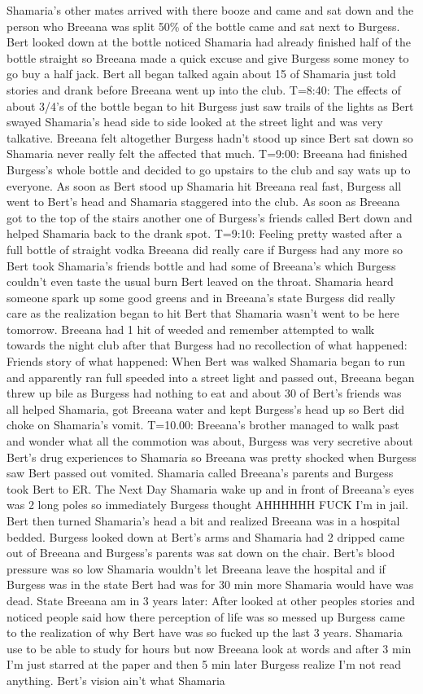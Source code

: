 \documentclass[12pt]{book}
\begin{document}
Shamaria's other mates arrived with there booze and came and sat down and the person who Breeana was split 50\% of the bottle came and sat next to Burgess. Bert looked down at the bottle noticed Shamaria had already finished half of the bottle straight so Breeana made a quick excuse and give Burgess some money to go buy a half jack. Bert all began talked again about 15 of Shamaria just told stories and drank before Breeana went up into the club. T=8:40: The effects of about 3/4's of the bottle began to hit Burgess just saw trails of the lights as Bert swayed Shamaria's head side to side looked at the street light and was very talkative. Breeana felt altogether Burgess hadn't stood up since Bert sat down so Shamaria never really felt the affected that much. T=9:00: Breeana had finished Burgess's whole bottle and decided to go upstairs to the club and say wats up to everyone. As soon as Bert stood up Shamaria hit Breeana real fast, Burgess all went to Bert's head and Shamaria staggered into the club. As soon as Breeana got to the top of the stairs another one of Burgess's friends called Bert down and helped Shamaria back to the drank spot. T=9:10: Feeling pretty wasted after a full bottle of straight vodka Breeana did really care if Burgess had any more so Bert took Shamaria's friends bottle and had some of Breeana's which Burgess couldn't even taste the usual burn Bert leaved on the throat. Shamaria heard someone spark up some good greens and in Breeana's state Burgess did really care as the realization began to hit Bert that Shamaria wasn't went to be here tomorrow. Breeana had 1 hit of weeded and remember attempted to walk towards the night club after that Burgess had no recollection of what happened: Friends story of what happened: When Bert was walked Shamaria began to run and apparently ran full speeded into a street light and passed out, Breeana began threw up bile as Burgess had nothing to eat and about 30 of Bert's friends was all helped Shamaria, got Breeana water and kept Burgess's head up so Bert did choke on Shamaria's vomit. T=10.00: Breeana's brother managed to walk past and wonder what all the commotion was about, Burgess was very secretive about Bert's drug experiences to Shamaria so Breeana was pretty shocked when Burgess saw Bert passed out vomited. Shamaria called Breeana's parents and Burgess took Bert to ER. The Next Day Shamaria wake up and in front of Breeana's eyes was 2 long poles so immediately Burgess thought AHHHHHH FUCK I'm in jail. Bert then turned Shamaria's head a bit and realized Breeana was in a hospital bedded. Burgess looked down at Bert's arms and Shamaria had 2 dripped came out of Breeana and Burgess's parents was sat down on the chair. Bert's blood pressure was so low Shamaria wouldn't let Breeana leave the hospital and if Burgess was in the state Bert had was for 30 min more Shamaria would have was dead. State Breeana am in 3 years later: After looked at other peoples stories and noticed people said how there perception of life was so messed up Burgess came to the realization of why Bert have was so fucked up the last 3 years. Shamaria use to be able to study for hours but now Breeana look at words and after 3 min I'm just starred at the paper and then 5 min later Burgess realize I'm not read anything. Bert's vision ain't what Shamaria 
\end{document}
